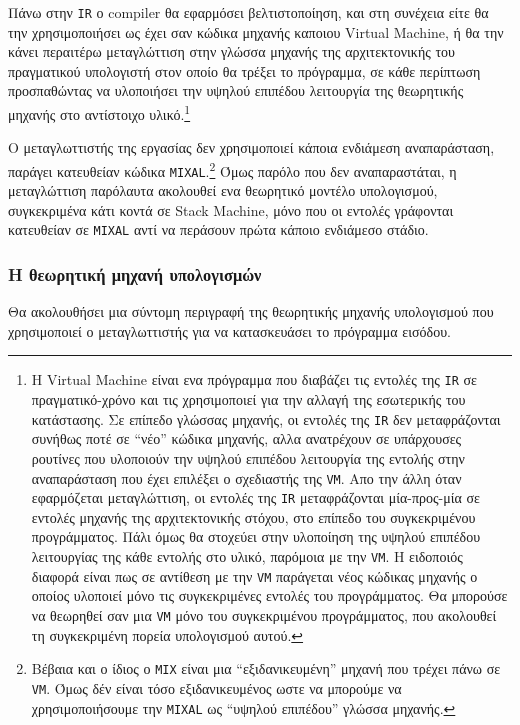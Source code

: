 \documentclass[a4paper,11pt]{article}
\newcommand{\eng}[1]{\foreignlanguage{english}{#1}}
\newcommand{\tech}[1]{\foreignlanguage{english}{\texttt{#1}}}
\begin{document}
Πάνω στην \tech{IR} ο \eng{compiler} θα
εφαρμόσει βελτιστοποίηση, και στη συνέχεια είτε θα την χρησιμοποιήσει ως έχει σαν κώδικα
μηχανής καποιου \eng{Virtual Machine}, ή θα την κάνει περαιτέρω μεταγλώττιση στην γλώσσα 
μηχανής της αρχιτεκτονικής του πραγματικού υπολογιστή στον οποίο θα τρέξει το πρόγραμμα,
σε κάθε περίπτωση προσπαθώντας να υλοποιήσει την υψηλού επιπέδου λειτουργία της 
θεωρητικής μηχανής στο αντίστοιχο υλικό.\footnote {
	Η \eng{Virtual Machine} είναι ενα πρόγραμμα που διαβάζει τις εντολές της \tech{IR} σε
	πραγματικό-χρόνο και τις χρησιμοποιεί για την αλλαγή της εσωτερικής του κατάστασης. 
	Σε επίπεδο γλώσσας μηχανής, οι εντολές της \tech{IR} δεν μεταφράζονται συνήθως ποτέ σε
	\enquote{νέο} κώδικα μηχανής, αλλα ανατρέχουν σε υπάρχουσες ρουτίνες που υλοποιούν την 
	υψηλού επιπέδου λειτουργία της εντολής στην αναπαράσταση που έχει επιλέξει ο σχεδιαστής 
	της \tech{VM}. Απο την άλλη όταν εφαρμόζεται μεταγλώττιση, οι εντολές της \tech{IR}
	μεταφράζονται μία-προς-μία σε εντολές μηχανής της αρχιτεκτονικής στόχου, στο επίπεδο του
	συγκεκριμένου προγράμματος. Πάλι όμως θα στοχεύει στην υλοποίηση της υψηλού επιπέδου
	λειτουργίας της κάθε εντολής στο υλικό, παρόμοια με την \tech{VM}. Η ειδοποιός διαφορά 
	είναι πως σε αντίθεση με την \tech{VM} παράγεται νέος κώδικας μηχανής ο οποίος υλοποιεί 
	μόνο τις συγκεκριμένες εντολές του προγράμματος. Θα μπορούσε να θεωρηθεί σαν μια \tech{VM}
	μόνο του συγκεκριμένου προγράμματος, που ακολουθεί τη συγκεκριμένη πορεία υπολογισμού αυτού.
} 

Ο μεταγλωττιστής της εργασίας δεν χρησιμοποιεί κάποια ενδιάμεση αναπαράσταση, παράγει
κατευθείαν κώδικα \tech{MIXAL}.\footnote {
	Βέβαια και ο ίδιος ο \tech{MIX} είναι μια \enquote{εξιδανικευμένη} μηχανή που τρέχει
	πάνω σε \tech{VM}. Όμως δέν είναι τόσο εξιδανικευμένος ωστε να μπορούμε να χρησιμοποιήσουμε
	την \tech{MIXAL} ως \enquote{υψηλού επιπέδου} γλώσσα μηχανής.
} Όμως παρόλο που δεν αναπαραστάται, η μεταγλώττιση παρόλαυτα ακολουθεί ενα θεωρητικό μοντέλο
υπολογισμού, συγκεκριμένα κάτι κοντά σε \eng{Stack Machine}, μόνο που οι εντολές γράφονται 
κατευθείαν σε \tech{MIXAL} αντί να περάσουν πρώτα κάποιο ενδιάμεσο στάδιο. 

\subsubsection{Η θεωρητική μηχανή υπολογισμών}
Θα ακολουθήσει μια σύντομη περιγραφή της θεωρητικής μηχανής υπολογισμού που χρησιμοποιεί
ο μεταγλωττιστής για να κατασκευάσει το πρόγραμμα εισόδου. 
\end{document}
